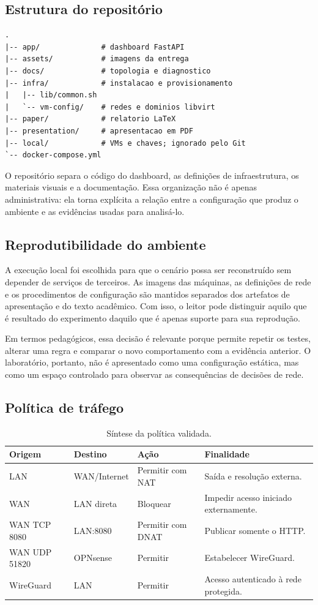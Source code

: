 \documentclass[12pt,a4paper]{article}
\begin{document}
\subsection{Estrutura do repositório}
\begin{lstlisting}[style=codigo,caption={Estrutura resumida do projeto.}]
.
|-- app/              # dashboard FastAPI
|-- assets/           # imagens da entrega
|-- docs/             # topologia e diagnostico
|-- infra/            # instalacao e provisionamento
|   |-- lib/common.sh
|   `-- vm-config/    # redes e dominios libvirt
|-- paper/            # relatorio LaTeX
|-- presentation/     # apresentacao em PDF
|-- local/            # VMs e chaves; ignorado pelo Git
`-- docker-compose.yml
\end{lstlisting}
O repositório separa o código do dashboard, as definições de infraestrutura, os
materiais visuais e a documentação. Essa organização não é apenas administrativa:
ela torna explícita a relação entre a configuração que produz o ambiente e as
evidências usadas para analisá-lo.

\subsection{Reprodutibilidade do ambiente}
A execução local foi escolhida para que o cenário possa ser reconstruído sem
depender de serviços de terceiros. As imagens das máquinas, as definições de rede
e os procedimentos de configuração são mantidos separados dos artefatos de
apresentação e do texto acadêmico. Com isso, o leitor pode distinguir aquilo que
é resultado do experimento daquilo que é apenas suporte para sua reprodução.

Em termos pedagógicos, essa decisão é relevante porque permite repetir os testes,
alterar uma regra e comparar o novo comportamento com a evidência anterior. O
laboratório, portanto, não é apresentado como uma configuração estática, mas
como um espaço controlado para observar as consequências de decisões de rede.

\subsection{Política de tráfego}
\begin{table}[H]\centering
\caption{Síntese da política validada.}\label{tab:politica}
\begin{tabularx}{\textwidth}{P{2.4cm}P{3cm}P{2.6cm}Y}\toprule
\textbf{Origem}&\textbf{Destino}&\textbf{Ação}&\textbf{Finalidade}\\\midrule
LAN&WAN/Internet&Permitir com NAT&Saída e resolução externa.\\
WAN&LAN direta&Bloquear&Impedir acesso iniciado externamente.\\
WAN TCP 8080&LAN:8080&Permitir com DNAT&Publicar somente o HTTP.\\
WAN UDP 51820&OPNsense&Permitir&Estabelecer WireGuard.\\
WireGuard&LAN&Permitir&Acesso autenticado à rede protegida.\\\bottomrule
\end{tabularx}\end{table}
\end{document}
